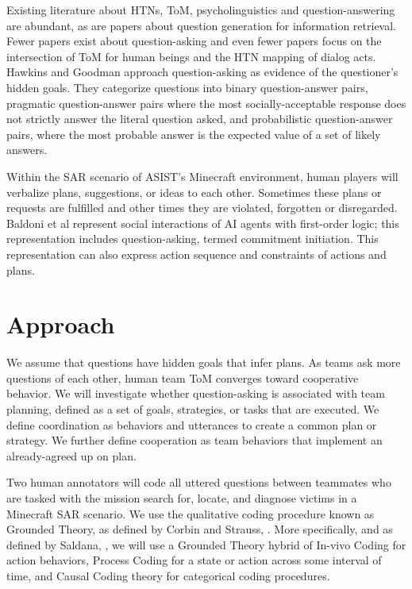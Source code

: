 Existing literature about HTNs, ToM, psycholinguistics and question-answering
are abundant, as are papers about question generation for information
retrieval. Fewer papers exist about question-asking and even fewer papers focus on the intersection of ToM for human beings and the HTN mapping of dialog acts. Hawkins and Goodman \citet{hawkins2017you} approach question-asking as evidence of the questioner’s hidden goals. They categorize questions into binary question-answer pairs, pragmatic question-answer pairs where the most socially-acceptable response does not strictly answer the literal question asked, and probabilistic question-answer pairs, where the most probable answer is the expected value of a set of likely answers.

Within the SAR scenario of ASIST’s Minecraft environment, human players will
verbalize plans, suggestions, or ideas to each other. Sometimes these plans or
requests are fulfilled and other times they are violated, forgotten or
disregarded. Baldoni et al \citet{baldoni_2018} represent social interactions of AI agents with first-order logic; this representation includes question-asking, termed commitment initiation. This representation can also express action sequence and constraints of actions and plans.



\section{Approach}

We assume that questions have hidden goals that infer plans. As teams ask more questions of each other, human team ToM converges toward cooperative behavior.
We will investigate whether question-asking is associated with team planning, defined as a set of goals, strategies, or tasks that are executed. We define coordination as behaviors and utterances to create a common plan or strategy. We further define cooperation as team behaviors that implement an already-agreed up on plan.

Two human annotators will code all uttered questions between teammates who are
tasked with the mission search for, locate, and diagnose victims in a Minecraft
SAR scenario. We use the qualitative coding procedure known as Grounded Theory,
as defined by Corbin and Strauss, \citet{corbin_strass_2015}. More
specifically, and as defined by Saldana, \citet{saldana_2015}, we will use a Grounded Theory hybrid of In-vivo Coding for action behaviors, Process Coding for a state or action across some interval of time, and Causal Coding theory for categorical coding procedures.

